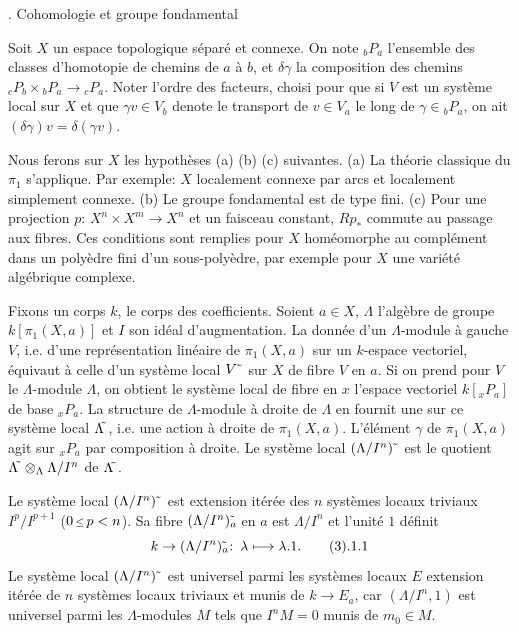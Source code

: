 

\newpage


\dspace
{}. Cohomologie et groupe fondamental 
\endsubhead

\endsubhead
Soit $X$ un espace topologique s\'epar\'e et
connexe.
On note ${}_bP_a$ l'ensemble des classes
d'homotopie de chemins de $a$ \`a $b$, et
$\delta\gamma$ la composition des chemins
$_cP_b\times{} _bP_a\to {}_cP_a$.
Noter l'ordre des facteurs, choisi pour que si
$V$ est un syst\`eme local sur $X$ et que
$\gamma v\in V_b$ denote le transport de $v\in
V_a$ le long de $\gamma\in {}_bP_a$, on ait
$(\delta\gamma)v=\delta(\gamma v)$.

Nous ferons sur $X$ les hypoth\`eses (a) (b)
(c) suivantes.
(a) La th\'eorie classique du $\pi_1$
s'applique.
Par exemple: $X$ localement connexe par arcs
et localement simplement connexe.
(b) Le groupe fondamental est de type fini.
(c) Pour une projection $p\colon\, X^n\times
X^m\to X^n$ et un faisceau constant, $Rp_*$
commute au passage aux fibres.
Ces conditions sont remplies pour $X$
hom\'eomorphe au compl\'ement dans un poly\`edre
fini d'un sous-poly\`edre, par exemple pour
$X$ une vari\'et\'e alg\'ebrique complexe.

Fixons un corps $k$, le corps des
coefficients.
Soient $a\in X$, $\Lambda$ l'alg\`ebre de
groupe $k[\pi_1(X,a)]$ et $I$ son id\'eal
d'augmentation.
La donn\'ee d'un $\Lambda$-module \`a gauche
$V$, i.e. d'une repr\'esentation lin\'eaire de
$\pi_1(X,a)$ sur un $k$-espace vectoriel,
\'equivaut \`a celle d'un syst\`eme local 
$V\uptil$ sur $X$ de fibre $V$ en $a$.
Si on prend pour $V$ le $\Lambda$-module
$\Lambda$, on obtient le syst\`eme local de
fibre en $x$ l'espace vectoriel $k[{}_xP_a]$
de base ${}_xP_a$.
La structure de $\Lambda$-module \`a droite de
$\Lambda$ en fournit une sur ce syst\`eme
local $\Lamuptil$, i.e. une action \`a
droite de $\pi_1(X,a)$.
L'\'el\'ement $\gamma$ de $\pi_1(X,a)$ agit
sur ${}_xP_a$ par composition \`a droite.
Le syst\`eme local $(\Lambda/I^n)\uptil$ est
le quotient $\Lamuptil \otimes_\Lambda
\Lambda/I^n$ de $\Lamuptil$.

Le syst\`eme local $(\Lambda/I^n)\uptil$ est
extension it\'er\'ee des $n$ syst\`emes locaux
triviaux $I^p/I^{p+1}$ ($0\Le p<n$).
Sa fibre $(\Lambda/I^n)_a\!\!\!\uptil$ en $a$
est $\Lambda/I^n$ et l'unit\'e $1$ d\'efinit
$$
k\to (\Lambda/I^n)_a\!\!\!\uptil\colon\,
\lambda\longmapsto \lambda.1.
\tag3.1.1
$$
Le syst\`eme local $(\Lambda/I^n)\uptil$
est universel parmi les syst\`emes locaux $E$
extension it\'er\'ee de $n$ syst\`emes locaux
triviaux et munis de $k\to E_a$, car
$(\Lambda/I^n,1)$ est universel parmi les
$\Lambda$-modules $M$ tels que $I^nM=0$ munis
de $m_0\in M$.

